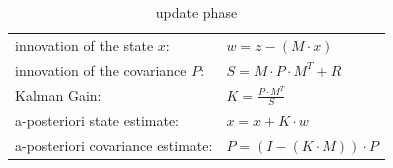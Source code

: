 \begin{table}[ht]
\begin{center}
\begin{tabular}{l l}
innovation of the state $x$: & $w = z - (M \cdot x)$\\
innovation of the covariance $P$: & $S = M \cdot P \cdot M^T + R$\\
Kalman Gain: & $K = \frac{P \cdot M^T}{S}$\\
a-posteriori state estimate: & $x = x + K \cdot w$ \\
a-posteriori covariance estimate: & $P = (I - (K \cdot M)) \cdot P$\\
\end{tabular}
\caption{update phase}
\end{center}
\end{table}
